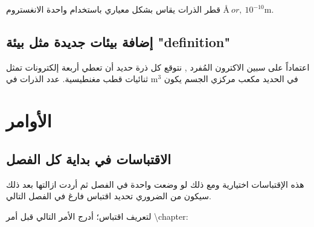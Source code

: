 \documentclass[12pt,a4paper]{mathbook_arabic}
\newcommand\ee{\textenglish}
\begin{document}
 
 
\begin{mabox}
 قطر الذرات يقاس بشكل معياري باستخدام واحدة الانغستروم
$\text{\AA }  \  or, \ 10^{-10}\mathrm{m}$.
\end{mabox}

\subsection{ إضافة بيئات جديدة مثل بيئة \ee{"definition"}}


 

\begin{mybox}
اعتماداً على سبين الاكترون المُفرد , نتوقع كل ذرة حديد أن تعطي أربعة إلكترونات تمثل ثنائيات قطب مغنطيسية. عدد الذرات في
\ee{m$^3$}
 في الحديد مكعب مركزي الجسم يكون
 \end{mybox}

 
\section{الأوامر}
\subsection{ الاقتباسات في بداية كل الفصل}
هذه الإقتباسات اختيارية ومع ذلك لو وضعت واحدة في الفصل ثم أردت ازالتها بعد ذلك سيكون من الضروري تحديد اقتباس فارغ في الفصل التالي.

 لتعريف اقتباس؛ أدرج الأمر التالي قبل أمر 
 \ee{\textbackslash{chapter}}:

\end{document}
